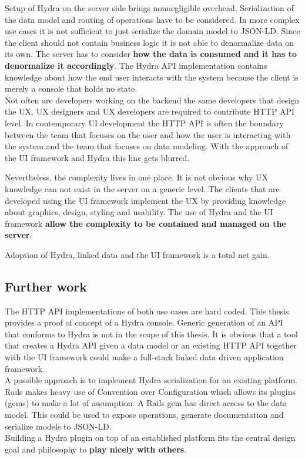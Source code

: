Setup of Hydra on the server side brings nonnegligible overhead. Serialization of the data model and routing of operations have to be considered. In more complex use cases it is not sufficient to just serialize the domain model to JSON-LD. Since the client should not contain business logic it is not able to denormalize data on its own. The server has to consider \textbf{how the data is consumed and it has to denormalize it accordingly}. The Hydra API implementation contains knowledge about how the end user interacts with the system because the client is merely a console that holds no state. \\
Not often are developers working on the backend the same developers that design the UX. UX designers and UX developers are required to contribute HTTP API level. In contemporary UI development the HTTP API is often the boundary between the team that focuses on the user and how the user is interacting with the system and the team that focuses on data modeling. With the approach of the UI framework and Hydra this line gets blurred.

Nevertheless, the complexity lives in one place. It is not obvious why UX knowledge can not exist in the server on a generic level. The clients that are developed using the UI framework implement the UX by providing knowledge about graphics, design, styling and usability. The use of Hydra and the UI framework \textbf{allow the complexity to be contained and managed on the server}.

Adoption of Hydra, linked data and the UI framework is a total net gain.

\subsection{Further work}
The HTTP API implementations of both use cases are hard coded. This thesis provides a proof of concept of a Hydra console. Generic generation of an API that conforms to Hydra is not in the scope of this thesis. It is obvious that a tool that creates a Hydra API given a data model or an existing HTTP API together with the UI framework could make a full-stack linked data driven application framework. \\
A possible approach is to implement Hydra serialization for an existing platform. Rails makes heavy use of Convention over Configuration which allows its plugins (gems) to make a lot of assumption. A Rails gem has direct access to the data model. This could be used to expose operations, generate documentation and serialize models to JSON-LD. \\
Building a Hydra plugin on top of an established platform fits the central design goal and philosophy to \textbf{play nicely with others}.
